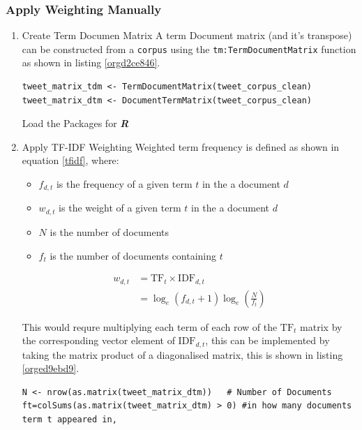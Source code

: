 \documentclass[11pt]{article}
\begin{document}
\subsubsection{Apply Weighting Manually}
\label{sec:org3b931e6}
\begin{enumerate}
\item Create Term Documen Matrix
\label{sec:orge620312}
A term Document matrix (and it's transpose) can be constructed from a \texttt{corpus} using the
\texttt{tm:TermDocumentMatrix} function as shown in listing \ref{orgd2ce846}.

\begin{listing}[htbp]
\begin{verbatim}
tweet_matrix_tdm <- TermDocumentMatrix(tweet_corpus_clean)
tweet_matrix_dtm <- DocumentTermMatrix(tweet_corpus_clean)
\end{verbatim}
\caption{\label{orgd2ce846}Load the Packages for \textbf{\textbf{\emph{R}}}}
\end{listing}

\item Apply TF-IDF Weighting
\label{sec:orgc202060}
Weighted term frequency is defined as shown in equation \eqref{tfidf}, where:

\begin{itemize}
\item \(f_{d,t}\) is the frequency of a given term \(t\) in the a document \(d\)
\item \(w_{d,t}\) is the weight of a given term \(t\) in the a document \(d\)
\item \(N\) is the number of documents
\item \(f_{t}\) is the number of documents containing \(t\)
\end{itemize}

\begin{equation}\begin{aligned}
w_{d, t} &=\mathrm{TF}_{t} \times \mathrm{IDF}_{d, t} \\
&=\log _{e}\left(f_{d, t}+1\right) \log _{e}\left(\frac{N}{f_{t}}\right) \label{tfidf}
\end{aligned}\end{equation}

This would requre multiplying each term of each row of the \(\mathrm{TF}_{t}\) matrix by the corresponding vector element of \(\mathrm{IDF}_{d,t}\), this can be implemented by taking the matrix product of a diagonalised matrix, this is shown in listing \ref{orged9ebd9}.

\begin{listing}[htbp]
\begin{verbatim}
N <- nrow(as.matrix(tweet_matrix_dtm))   # Number of Documents
ft=colSums(as.matrix(tweet_matrix_dtm) > 0) #in how many documents term t appeared in,


\end{verbatim}
\end{listing}
\end{enumerate}
\end{document}
